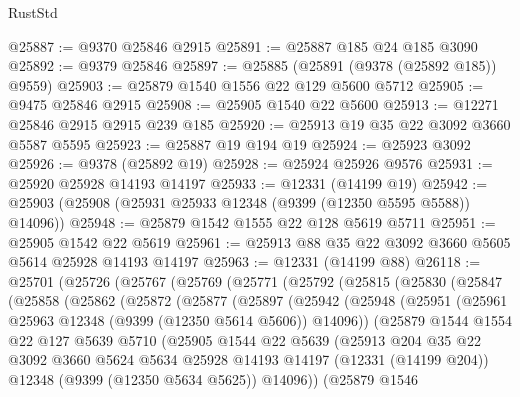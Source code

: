 \begin{lexlean}{RustStd}
\begin{coremodule}
@25887 := @9370 @25846 @2915
@25891 := @25887 @185 @24 @185 @3090
@25892 := @9379 @25846
@25897 := @25885 (@25891 (@9378 (@25892 @185)) @9559)
@25903 := @25879 @1540 @1556 @22 @129 @5600 @5712
@25905 := @9475 @25846 @2915
@25908 := @25905 @1540 @22 @5600
@25913 := @12271 @25846 @2915 @2915 @239 @185
@25920 := @25913 @19 @35 @22 @3092 @3660 @5587 @5595
@25923 := @25887 @19 @194 @19
@25924 := @25923 @3092
@25926 := @9378 (@25892 @19)
@25928 := @25924 @25926 @9576
@25931 := @25920 @25928 @14193 @14197
@25933 := @12331 (@14199 @19)
@25942 := @25903 (@25908 (@25931 @25933 @12348 (@9399 (@12350 @5595 @5588)) @14096))
@25948 := @25879 @1542 @1555 @22 @128 @5619 @5711
@25951 := @25905 @1542 @22 @5619
@25961 := @25913 @88 @35 @22 @3092 @3660 @5605 @5614 @25928 @14193 @14197
@25963 := @12331 (@14199 @88)
@26118 := @25701
    (@25726
      (@25767
        (@25769
          (@25771
            (@25792
              (@25815
                (@25830
                  (@25847
                    (@25858
                      (@25862
                        (@25872
                          (@25877
                            (@25897
                              (@25942
                                (@25948
                                  (@25951
                                    (@25961 @25963 @12348 (@9399 (@12350 @5614 @5606)) @14096))
                                  (@25879
                                    @1544
                                    @1554
                                    @22
                                    @127
                                    @5639
                                    @5710
                                    (@25905
                                      @1544
                                      @22
                                      @5639
                                      (@25913
                                        @204
                                        @35
                                        @22
                                        @3092
                                        @3660
                                        @5624
                                        @5634
                                        @25928
                                        @14193
                                        @14197
                                        (@12331 (@14199 @204))
                                        @12348
                                        (@9399 (@12350 @5634 @5625))
                                        @14096))
                                    (@25879
                                      @1546

\end{coremodule}
\end{lexlean}
